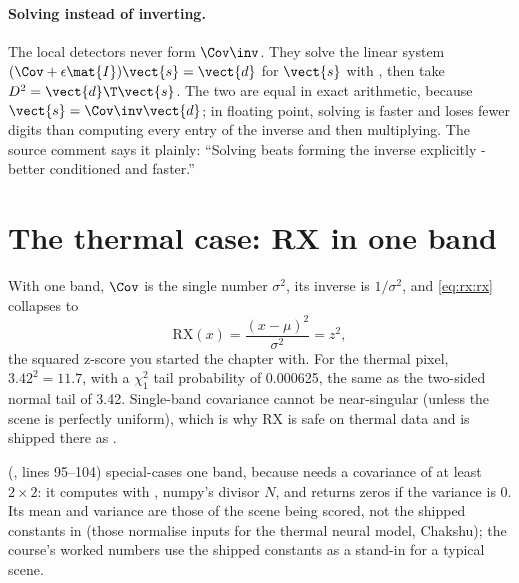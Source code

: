\paragraph{Solving instead of inverting.} The local detectors never form $\Cov\inv$. They solve the
linear system $(\Cov + \epsilon\mat{I})\vect{s} = \vect{d}$ for $\vect{s}$ with
, then take $D^2 = \vect{d}\T\vect{s}$. The two are equal in exact arithmetic,
because $\vect{s} = \Cov\inv\vect{d}$; in floating point, solving is faster and loses fewer digits
than computing every entry of the inverse and then multiplying. The source comment says it plainly:
``Solving beats forming the inverse explicitly - better conditioned and faster.''

\section{The thermal case: RX in one band}\label{sec:rx:thermal}

With one band, $\Cov$ is the single number $\sigma^2$, its inverse is $1/\sigma^2$, and
\cref{eq:rx:rx} collapses to
\[
\text{RX}(x) = \frac{(x - \mu)^2}{\sigma^2} = z^2,
\]
the squared z-score you started the chapter with. For the thermal pixel, $3.42^2 = 11.7$, with a
$\chi^2_1$ tail probability of 0.000625\tagC, the same as the two-sided normal tail of 3.42. Single-band
covariance cannot be near-singular (unless the scene is perfectly uniform), which is why RX is safe on
thermal data and is shipped there as .

\begin{sourcenote}
 (, lines 95--104)
special-cases one band, because  needs a covariance of at least $2\times2$: it
computes  with , numpy's divisor $N$, and
returns zeros if the variance is 0. Its mean and variance are those of the scene being scored, not the
shipped constants in  (those normalise inputs for the thermal neural
model, Chakshu); the course's worked numbers use the shipped constants as a stand-in for a typical
scene.
\end{sourcenote}

